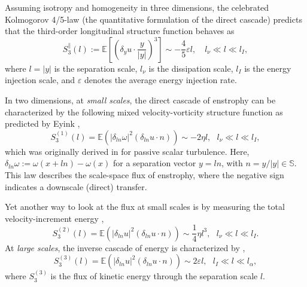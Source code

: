 \documentclass[11pt,a4paper]{article}
\numberwithin{equation}{section}
\numberwithin{theorem}{section}
\numberwithin{remark}{section}
\numberwithin{definition}{section}
\begin{document}
Assuming isotropy and homogeneity in three dimensions, the celebrated Kolmogorov 4/5-law (the quantitative formulation of the direct cascade) predicts that the third-order longitudinal structure function behaves as
\begin{equation}\label{thirdorderenergy}
    S_3^{\parallel}(l) := \mathbb{E}\left[\left(\delta_y u \cdot \frac{y}{|y|}\right)^3\right] \sim -\frac{4}{5} \varepsilon l, \quad l_\nu \ll l \ll l_I,
\end{equation}
where $l = |y|$ is the separation scale, $l_\nu$ is the dissipation scale, $l_I$ is the energy injection scale, and $\varepsilon$ denotes the average energy injection rate.


In two dimensions, at \textit{small scales}, the direct cascade of enstrophy can be characterized by the following mixed velocity-vorticity structure function as predicted by Eyink \cite{eyink},
\begin{equation}\label{eq: velocity-vorticity str}
    S_3^{(1)}(l)=\mathbb{E}\left(|\delta_{ln} \omega|^2 (\delta_{ln} u\cdot n) \right)\sim -2\eta l, 
 \ \ \ l_\nu \ll l \ll l_I,
\end{equation}
which was originally derived in \cite{yaglom} for passive scalar turbulence. Here, $\delta_{ln}\omega:= \omega(x+ln)-\omega(x)$ for a separation vector $y=ln$, with $n=y/|y| \in \mathbb{S}$. This law describes the scale-space flux of enstrophy, where the negative sign indicates a downscale (direct) transfer. 

Yet another way to look at the flux at small scales is by measuring the total velocity-increment energy \cite{bed2D},
\begin{equation}\label{eq: velocity-velocity small scale}
    S_3^{(2)}(l)=\mathbb{E}\left(|\delta_{ln} u|^2 (\delta_{ln} u\cdot n)\right)\sim \frac{1}{4}\eta l^3, 
 \ \ \ l_\nu \ll l \ll l_I.
\end{equation}
At \textit{large scales}, the inverse cascade of energy is characterized by \cite{bed2D},
\begin{equation}\label{eq: velocity-velocity large scale}
    S_3^{(3)}(l)=\mathbb{E}\left(|\delta_{ln} u|^2 (\delta_{ln} u\cdot n)\right)\sim 2\varepsilon l, 
 \ \ \ l_I \ll l \ll l_{\alpha},
\end{equation}
where $S^{(3)}_3$ is the flux of kinetic energy through the separation scale $l$.
\end{document}
